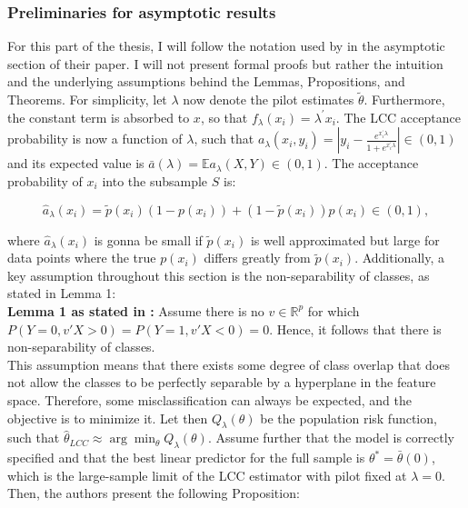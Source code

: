 \subsubsection{Preliminaries for asymptotic results}

For this part of the thesis, I will follow the notation used by \textcite{hastie2014} in the asymptotic section of their paper. I will not present formal proofs but rather the intuition and the underlying assumptions behind the Lemmas, Propositions, and Theorems. For simplicity, let $\lambda$ now denote the pilot estimates $\tilde{\theta}$. Furthermore, the constant term is absorbed to $x$, so that $f_{\lambda} (x_i) = \lambda^{\prime} x_i$. The LCC acceptance probability is now a function of $\lambda$, such that $a_\lambda(x_i, y_i)=\left|y_i-\frac{e^{x_i^{\prime} \lambda}}{1 + e^{x_i^{\prime} \lambda}}\right| \in(0,1)$ and its expected value is $\bar{a}(\lambda) = \mathbb{E} a_{\lambda}(X, Y) \in (0,1)$. The acceptance probability of $x_i$ into the subsample $S$ is:

\begin{equation}
    \hat{a}_{\lambda}(x_i) = \tilde{p}(x_i)(1 - p(x_i)) + (1 - \tilde{p}(x_i))p(x_i) \in (0,1), 
\end{equation}

where $\hat{a}_{\lambda}(x_i)$ is gonna be small if $\tilde{p}(x_i)$ is well approximated but large for data points where the true $p(x_i)$ differs greatly from $\tilde{p}(x_i)$. Additionally, a key assumption throughout this section is the non-separability of classes, as stated in Lemma 1:\\

\textbf{Lemma 1 as stated in \textcite{hastie2014}:}
Assume there is no $v \in \mathbb{R}^p$ for which $P(Y=0, v \prime X>0) = P(Y=1, v \prime X<0) = 0$. Hence, it follows that there is non-separability of classes.\\

This assumption means that there exists some degree of class overlap that does not allow the classes to be perfectly separable by a hyperplane in the feature space. Therefore, some misclassification can always be expected, and the objective is to minimize it. Let then $Q_\lambda(\theta)$ be the population risk function, such that $\hat{\theta}_{LCC} \approx \arg \min_\theta Q_\lambda(\theta)$. Assume further that the model is correctly specified and that the best linear predictor for the full sample is $\theta^* = \bar{\theta}(0)$, which is the large-sample limit of the LCC estimator with pilot fixed at $\lambda = 0$. Then, the authors present the following Proposition: \\

